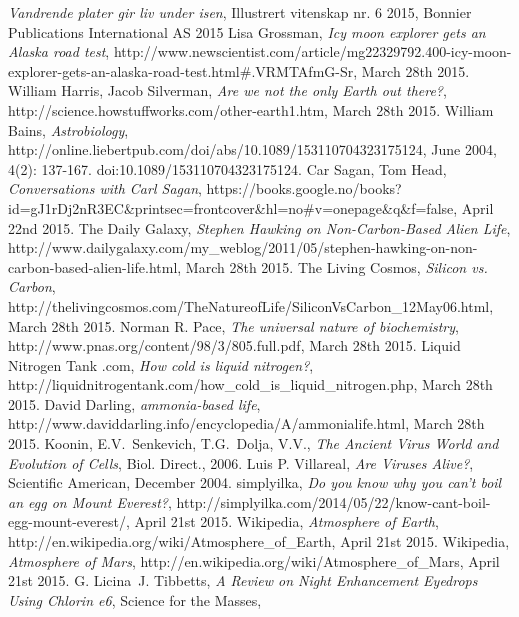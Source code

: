 \begin{thebibliography}{99}
		\emph{Vandrende plater gir liv under isen},
		Illustrert vitenskap nr. 6 2015,
		Bonnier Publications International AS
		2015
		Lisa Grossman,
		\emph{Icy moon explorer gets an Alaska road test},
		http://www.newscientist.com/article/mg22329792.400-icy-moon-explorer-gets-an-alaska-road-test.html\#.VRMTAfmG-Sr,
		March 28th 2015.
		William Harris, Jacob Silverman,
		\emph{Are we not the only Earth out there?},
		http://science.howstuffworks.com/other-earth1.htm,
		March 28th 2015.
		William Bains,
		\emph{Astrobiology},
		http://online.liebertpub.com/doi/abs/10.1089/153110704323175124,
		June 2004, 4(2): 137-167. doi:10.1089/153110704323175124.
		Car Sagan, Tom Head,
		\emph{Conversations with Carl Sagan},
		https://books.google.no/books?id=gJ1rDj2nR3EC\&printsec=frontcover\&hl=no\#v=onepage\&q\&f=false,
		April 22nd 2015.
		The Daily Galaxy,
		\emph{Stephen Hawking on Non-Carbon-Based Alien Life},
		http://www.dailygalaxy.com/my\_weblog/2011/05/stephen-hawking-on-non-carbon-based-alien-life.html,
		March 28th 2015.
		The Living Cosmos,
		\emph{Silicon vs. Carbon},
		http://thelivingcosmos.com/TheNatureofLife/SiliconVsCarbon\_12May06.html,
		March 28th 2015.
		Norman R. Pace,
		\emph{The universal nature of biochemistry},
		http://www.pnas.org/content/98/3/805.full.pdf,
		March 28th 2015.
		Liquid Nitrogen Tank .com,
		\emph{How cold is liquid nitrogen?},
		http://liquidnitrogentank.com/how\_cold\_is\_liquid\_nitrogen.php,
		March 28th 2015.
		David Darling,
		\emph{ammonia-based life},
		http://www.daviddarling.info/encyclopedia/A/ammonialife.html,
		March 28th 2015.
		Koonin, E.V.\, Senkevich, T.G.\, Dolja, V.V.,
		\emph{The Ancient Virus World and Evolution of Cells},
		Biol. Direct.,
		2006.
		Luis P. Villareal,
		\emph{Are Viruses Alive?},
		Scientific American,
		December 2004.
		simplyilka,
		\emph{Do you know why you can’t boil an egg on Mount Everest?},
		http://simplyilka.com/2014/05/22/know-cant-boil-egg-mount-everest/,
		April 21st 2015.
		Wikipedia,
		\emph{Atmosphere of Earth},
		http://en.wikipedia.org/wiki/Atmosphere\_of\_Earth,
		April 21st 2015.
		Wikipedia,
		\emph{Atmosphere of Mars},
		http://en.wikipedia.org/wiki/Atmosphere\_of\_Mars,
		April 21st 2015.
		G. Licina\, J. Tibbetts,
		\emph{A Review on Night Enhancement Eyedrops Using Chlorin e6},
		Science for the Masses,

\end{thebibliography}
